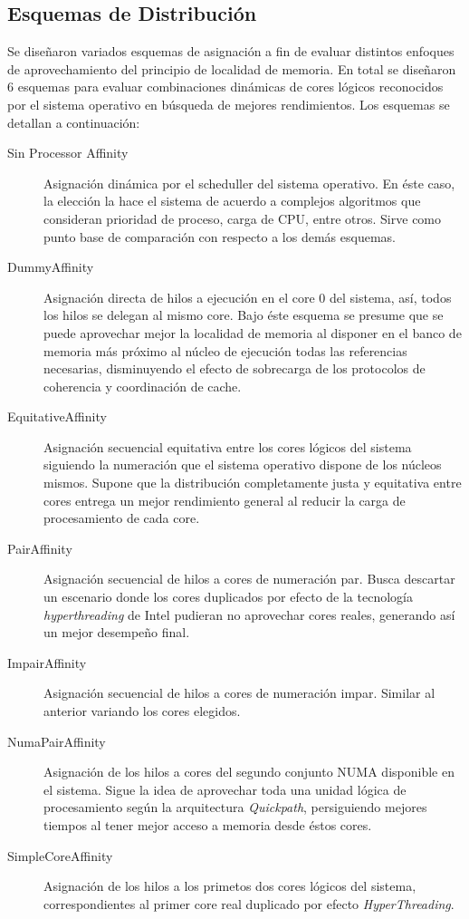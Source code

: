 \subsection{Esquemas de Distribución}
Se diseñaron variados esquemas de asignación a fin de evaluar distintos enfoques de aprovechamiento del principio de localidad de memoria. En total se diseñaron 6 esquemas para evaluar combinaciones dinámicas de cores lógicos reconocidos por el sistema operativo en búsqueda de mejores rendimientos. Los esquemas se detallan a continuación:
\begin{description}
\item[Sin Processor Affinity] Asignación dinámica por el scheduller del sistema operativo. En éste caso, la elección la hace el sistema de acuerdo a complejos algoritmos que consideran prioridad de proceso, carga de CPU, entre otros. Sirve como punto base de comparación con respecto a los demás esquemas.
\item[DummyAffinity] Asignación directa de hilos a ejecución en el core 0 del sistema, así, todos los hilos se delegan al mismo core. Bajo éste esquema se presume que se puede aprovechar mejor la localidad de memoria al disponer en el banco de memoria más próximo al núcleo de ejecución todas las referencias necesarias, disminuyendo el efecto de sobrecarga de los protocolos de coherencia y coordinación de cache.
\item[EquitativeAffinity] Asignación secuencial equitativa entre los cores lógicos del sistema siguiendo la numeración que el sistema operativo dispone de los núcleos mismos. Supone que la distribución completamente justa y equitativa entre cores entrega un mejor rendimiento general al reducir la carga de procesamiento de cada core.
\item[PairAffinity] Asignación secuencial de hilos a cores de numeración par. Busca descartar un escenario donde los cores duplicados por efecto de la tecnología \emph{hyperthreading} de Intel pudieran no aprovechar cores reales, generando así un mejor desempeño final.
\item[ImpairAffinity] Asignación secuencial de hilos a cores de numeración impar. Similar al anterior variando los cores elegidos.
\item[NumaPairAffinity] Asignación de los hilos a cores del segundo conjunto NUMA disponible en el sistema. Sigue la idea de aprovechar toda una unidad lógica de procesamiento según la arquitectura \emph{Quickpath}, persiguiendo mejores tiempos al tener mejor acceso a memoria desde éstos cores.
\item[SimpleCoreAffinity] Asignación de los hilos a los primetos dos cores lógicos del sistema, correspondientes al primer core real duplicado por efecto \emph{HyperThreading}.
\end{description}


